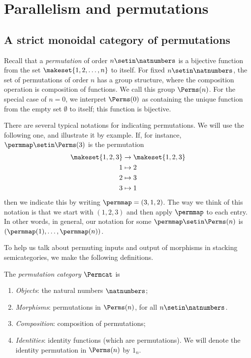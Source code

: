 
\section{Parallelism and permutations}
\label{sec:parallelism-and-permutations}


\subsection{A strict monoidal category of permutations}

Recall that a \emph{permutation} of order $n \setin\natnumbers$ is a bijective function from the set $\makeset{1,2, \dots , n}$ to itself.
For fixed $n \setin\natnumbers$, the set of permutations of order $n$ has a group structure, where the composition operation is composition of functions.
We call this group $\Perms(n)$.
For the special case of $n = 0$, we interpret $\Perms(0)$ as containing the unique function from the empty set $\emptyset$ to itself; this function is bijective.

There are several typical notations for indicating permutations.
We will use the following one, and illustrate it by example.
If, for instance, $\permmap \setin \Perms(3)$ is the permutation
\begin{align*}
    \makeset{1,2,3} & \to \makeset{1,2,3} \\
    1               & \mapsto 2 \\
    2               & \mapsto 3 \\
    3               & \mapsto 1
\end{align*}
then we indicate this by writing $\permmap = (3, 1, 2)$.
The way we think of this notation is that we start with $(1, 2, 3)$ and then apply $\permmap$ to each entry.
In other words, in general, our notation for some $\permmap \setin \Perms(n)$ is $(\permmap(1), \dots, \permmap(n))$.

To help us talk about permuting inputs and output of morphisms in stacking semicategories, we make the following definitions.

\begin{definition}\label{def:Permcat}
    The \emph{permutation category} $\Permcat$ is
    \begin{enumerate}
        \item \emph{Objects}: the natural numbers $\natnumbers$;
        \item \emph{Morphisms}: permutations in $\Perms(n)$, for all $n \setin \natnumbers$.
        \item \emph{Composition}: composition of permutations;
        \item \emph{Identities}: identity functions (which are permutations).
              We will denote the identity permutation in $\Perms(n)$ by $1_n$.
    \end{enumerate}
\end{definition}

